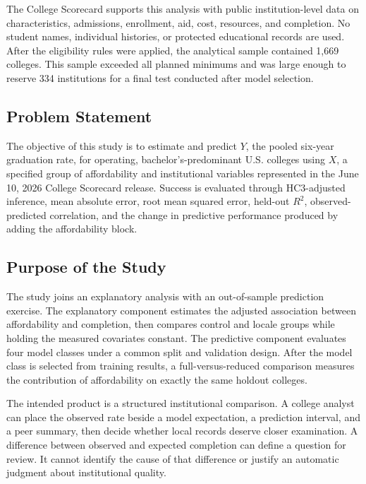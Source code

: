 \documentclass[12pt,a4paper]{article}
\newcommand{\Rtwo}{\ensuremath{R^{2}}}
\begin{document}
The College Scorecard supports this analysis with public institution-level data on characteristics, admissions, enrollment, aid, cost, resources, and completion. No student names, individual histories, or protected educational records are used. After the eligibility rules were applied, the analytical sample contained 1,669 colleges. This sample exceeded all planned minimums and was large enough to reserve 334 institutions for a final test conducted after model selection.

\subsection{Problem Statement}

The objective of this study is to estimate and predict $Y$, the pooled six-year graduation rate, for operating, bachelor's-predominant U.S. colleges using $X$, a specified group of affordability and institutional variables represented in the June 10, 2026 College Scorecard release. Success is evaluated through HC3-adjusted inference, mean absolute error, root mean squared error, held-out \Rtwo, observed-predicted correlation, and the change in predictive performance produced by adding the affordability block.

\subsection{Purpose of the Study}

The study joins an explanatory analysis with an out-of-sample prediction exercise. The explanatory component estimates the adjusted association between affordability and completion, then compares control and locale groups while holding the measured covariates constant. The predictive component evaluates four model classes under a common split and validation design. After the model class is selected from training results, a full-versus-reduced comparison measures the contribution of affordability on exactly the same holdout colleges.

The intended product is a structured institutional comparison. A college analyst can place the observed rate beside a model expectation, a prediction interval, and a peer summary, then decide whether local records deserve closer examination. A difference between observed and expected completion can define a question for review. It cannot identify the cause of that difference or justify an automatic judgment about institutional quality.
\end{document}

